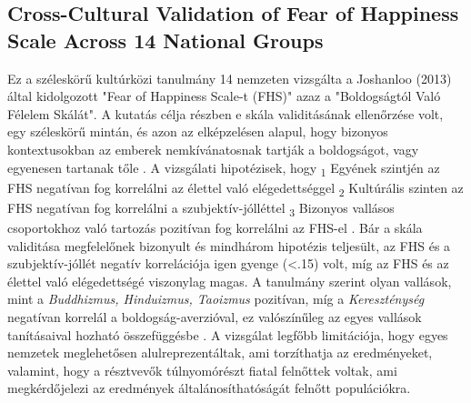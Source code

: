 \subsection*{Cross-Cultural Validation of
	Fear of Happiness Scale Across 14 National Groups \cite{joshanloo_lepshokova_panyusheva_natalia_poon_yeung_sundaram_achoui_asano_igarashi}}
Ez a széleskörű kultúrközi tanulmány 14 nemzeten vizsgálta a Joshanloo (2013) által kidolgozott "Fear of Happiness Scale-t (FHS)" azaz a "Boldogságtól Való Félelem Skálát". A kutatás célja részben e skála validitásának ellenőrzése volt, egy széleskörű mintán, és azon az elképzelésen alapul, hogy bizonyos kontextusokban az emberek nemkívánatosnak tartják a boldogságot, vagy egyenesen tartanak tőle \cite{joshanloo_lepshokova_panyusheva_natalia_poon_yeung_sundaram_achoui_asano_igarashi}. A vizsgálati hipotézisek, hogy \textsubscript{1} Egyének szintjén az FHS negatívan fog korrelálni az élettel való elégedettséggel \textsubscript{2} Kultúrális szinten az FHS negatívan fog korrelálni a szubjektív-jólléttel \textsubscript{3} Bizonyos vallásos csoportokhoz való tartozás pozitívan fog korrelálni az FHS-el \cite{joshanloo_lepshokova_panyusheva_natalia_poon_yeung_sundaram_achoui_asano_igarashi}. Bár a skála validitása megfelelőnek bizonyult és mindhárom hipotézis teljesült, az FHS és a szubjektív-jóllét negatív korrelációja igen gyenge (\textless.15) volt, míg az FHS és az élettel való elégedettségé viszonylag magas. A tanulmány szerint olyan vallások, mint a \textit{Buddhizmus, Hinduizmus, Taoizmus} pozitívan, míg a \textit{Kereszténység} negatívan korrelál a boldogság-averzióval, ez valószínűleg az egyes vallások tanításaival hozható összefüggésbe \cite{joshanloo_lepshokova_panyusheva_natalia_poon_yeung_sundaram_achoui_asano_igarashi}. A vizsgálat legfőbb limitációja, hogy egyes nemzetek meglehetősen alulreprezentáltak, ami torzíthatja az eredményeket, valamint, hogy a résztvevők túlnyomórészt fiatal felnőttek voltak, ami megkérdőjelezi az eredmények általánosíthatóságát felnőtt populációkra.

